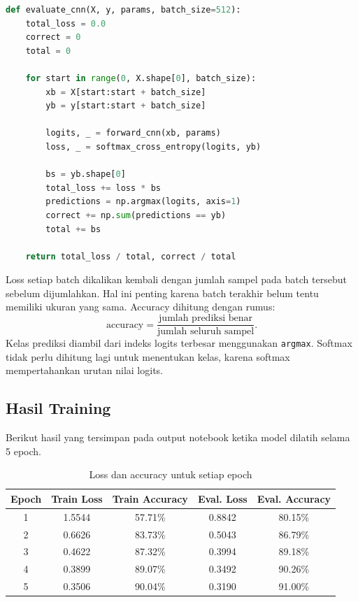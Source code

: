 \documentclass[12pt, letterpaper]{article}
\begin{document}
\begin{lstlisting}[language=Python, caption=Menghitung loss dan accuracy model]
def evaluate_cnn(X, y, params, batch_size=512):
    total_loss = 0.0
    correct = 0
    total = 0

    for start in range(0, X.shape[0], batch_size):
        xb = X[start:start + batch_size]
        yb = y[start:start + batch_size]

        logits, _ = forward_cnn(xb, params)
        loss, _ = softmax_cross_entropy(logits, yb)

        bs = yb.shape[0]
        total_loss += loss * bs
        predictions = np.argmax(logits, axis=1)
        correct += np.sum(predictions == yb)
        total += bs

    return total_loss / total, correct / total
\end{lstlisting}

Loss setiap batch dikalikan kembali dengan jumlah sampel pada batch tersebut sebelum dijumlahkan. Hal ini penting karena batch terakhir belum tentu memiliki ukuran yang sama. Accuracy dihitung dengan rumus:
\begin{equation}
  \text{accuracy} = \frac{\text{jumlah prediksi benar}}
  {\text{jumlah seluruh sampel}}.
\end{equation}
Kelas prediksi diambil dari indeks logits terbesar menggunakan \texttt{argmax}. Softmax tidak perlu dihitung lagi untuk menentukan kelas, karena softmax mempertahankan urutan nilai logits.

\subsection*{Hasil Training}
Berikut hasil yang tersimpan pada output notebook ketika model dilatih selama 5 epoch.

\begin{table}[H]
\centering
\small
\begin{tabular}{c|cc|cc}
\hline
\textbf{Epoch} & \textbf{Train Loss} & \textbf{Train Accuracy} & \textbf{Eval. Loss} & \textbf{Eval. Accuracy} \\
\hline
1 & 1.5544 & 57.71\% & 0.8842 & 80.15\% \\
2 & 0.6626 & 83.73\% & 0.5043 & 86.79\% \\
3 & 0.4622 & 87.32\% & 0.3994 & 89.18\% \\
4 & 0.3899 & 89.07\% & 0.3492 & 90.26\% \\
5 & 0.3506 & 90.04\% & 0.3190 & 91.00\% \\
\hline
\end{tabular}
\caption{Loss dan accuracy untuk setiap epoch}
\label{tab:training-history}
\end{table}
\end{document}
